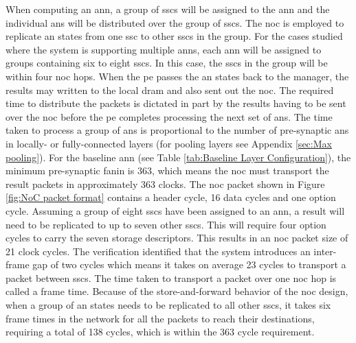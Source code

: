 When computing an \ac{ann}, a group of \acp{ssc} will be assigned to the \ac{ann} and the individual \acp{an} will be distributed over the group of \acp{ssc}.
The \ac{noc} is employed to replicate \ac{an} states from one \ac{ssc} to other \acp{ssc} in the group.
For the cases studied where the system is supporting multiple \acp{ann}, each \ac{ann} will be assigned to groups containing six to eight \acp{ssc}.
In this case, the \acp{ssc} in the group will be within four \ac{noc} hops.
When the \ac{pe} passes the \ac{an} states back to the manager, the results may written to the local \ac{dram} and also sent out the \ac{noc}.
The required time to distribute the packets is dictated in part by the results having to be sent over the \ac{noc} before the \ac{pe} completes processing the next set of \acp{an}.
The time taken to process a group of \acp{an} is proportional to the number of pre-synaptic \acp{an} in locally- or fully-connected layers (for pooling layers see Appendix \ref{sec:Max pooling}).
For the baseline \ac{ann} (see Table \ref{tab:Baseline Layer Configuration}), the minimum pre-synaptic fanin is 363, which means the \ac{noc} must transport the result packets in approximately 363 clocks.
The \ac{noc} packet shown in Figure \ref{fig:NoC packet format} contains a header cycle, 16 data cycles and one option cycle. 
Assuming a group of eight \acp{ssc} have been assigned to an \ac{ann}, a result will need to be replicated to up to seven other \acp{ssc}.
This will require four option cycles to carry the seven storage descriptors. This results in an \ac{noc} packet size of 21 clock cycles.
The verification identified that the system introduces an inter-frame gap of two cycles which means it takes on average 23 cycles to transport a packet between \acp{ssc}.
The time taken to transport a packet over one \ac{noc} hop is called a frame time.
Because of the store-and-forward behavior of the \ac{noc} design, when a group of \ac{an} states needs to be replicated to all other \acp{ssc}, it takes six frame times in the network for all the packets to reach their destinations,
requiring a total of 138 cycles, which is within the 363 cycle requirement.

